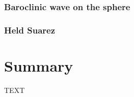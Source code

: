 \documentclass[journal abbreviation, manuscript]{copernicus}
\begin{document}
\subsubsection{Baroclinic wave on the sphere}

\subsubsection{Held Suarez}

\section{Summary}
\label{sec: summary}


\conclusions  %
TEXT












\appendix
\section{}    %

\subsection{}     %


\noappendix       %

\end{document}
